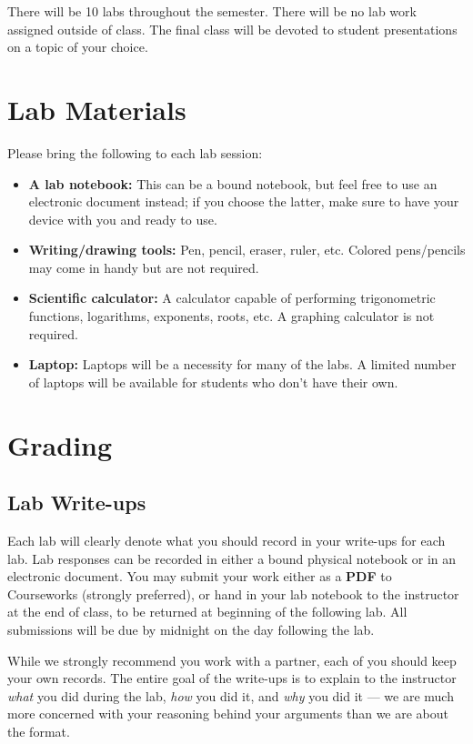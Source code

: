 \documentclass[11pt]{article}
\begin{document}
\noindent There will be 10 labs throughout the semester.  There will be no lab work assigned outside of class. The final class will be devoted to student presentations on a topic of your choice.
 
\section*{Lab Materials}
 
Please bring the following to each lab session:
 
\begin{itemize}
\item \textbf{A lab notebook:} This can be a bound notebook, but feel free to use an electronic document instead; if you choose the latter, make sure to have your device with you and ready to use.  
\item \textbf{Writing/drawing tools:} Pen, pencil, eraser, ruler, etc. Colored pens/pencils may come in handy but are not required.
\item \textbf{Scientific calculator:}  A calculator capable of performing trigonometric functions, logarithms, exponents, roots, etc. A graphing calculator is not required. 
\item \textbf{Laptop:} Laptops will be a necessity for many of the labs.  A limited number of laptops will be available for students who don't have their own. \\
\end{itemize}

\section*{Grading}

\subsection*{Lab Write-ups}
Each lab will clearly denote what you should record in your write-ups for each lab. Lab responses can be recorded in either a bound physical notebook or in an electronic document. You may submit your work either as a \textbf{PDF} to Courseworks (strongly preferred), or hand in your lab notebook to the instructor at the end of class, to be returned at beginning of the following lab.  All submissions will be due by midnight on the day following the lab.

\noindent While we strongly recommend you work with a partner, each of you should keep your own records. The entire goal of the write-ups is to explain to the instructor \textit{what} you did during the lab, \textit{how} you did it, and \textit{why} you did it --- we are much more concerned with your reasoning behind your arguments than we are about the format.
\end{document}

